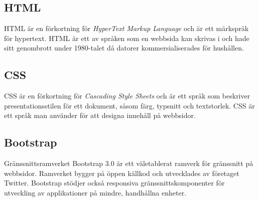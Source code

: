 \subsection{HTML}
\label{sec:html}
HTML är en förkortning för \textit{HyperText Markup Language} och är ett märkspråk för hypertext. HTML är ett av språken som en webbsida kan skrivas i och hade sitt genombrott under 1980-talet då datorer kommersialiserades för hushållen. 

\subsection{CSS}
\label{sec:css}
CSS är en förkortning för \textit{Cascading Style Sheets} och är ett språk som beskriver presentationsstilen för ett dokument, såsom färg, typsnitt och textstorlek. CSS är ett språk man använder för att designa innehåll på webbsidor.


\subsection{Bootstrap}
Gränssnittsramverket Bootstrap 3.0 är ett väletablerat ramverk för gränssnitt på webbsidor. Ramverket bygger på öppen källkod och utvecklades av företaget Twitter. Bootstrap stödjer också responsiva gränssnittskomponenter för utveckling av applikationer på mindre, handhållna enheter.\cite{website:bootstrap}
